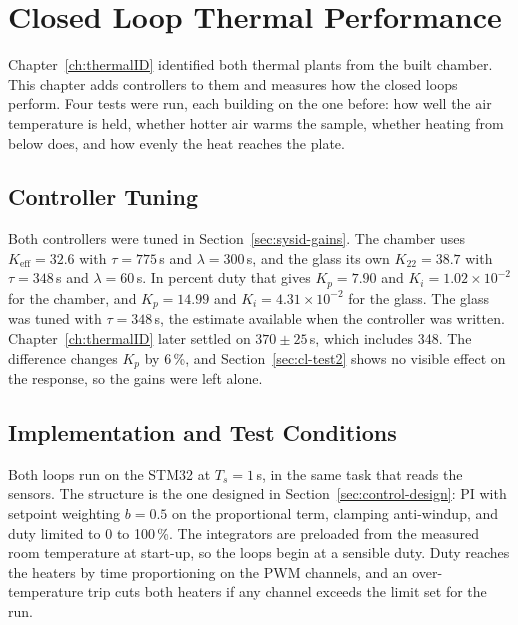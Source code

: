 \chapter{Closed Loop Thermal Performance}
\label{ch:ClosedLoop}


Chapter~\ref{ch:thermalID} identified both thermal plants from the built chamber. This chapter adds controllers to them and measures how the closed loops perform. Four tests were run, each building on the one before: how well the air temperature is held, whether hotter air warms the sample, whether heating from below does, and how evenly the heat reaches the plate.

\section{Controller Tuning}
\label{sec:cl-tuning}

Both controllers were tuned in Section~\ref{sec:sysid-gains}. The chamber uses $K_\mathrm{eff} = 32.6$ with $\tau = 775$\,s and $\lambda = 300$\,s, and the glass its own $K_{22} = 38.7$ with $\tau = 348$\,s and $\lambda = 60$\,s. In percent duty that gives $K_p = 7.90$ and $K_i = 1.02\times10^{-2}$ for the chamber, and $K_p = 14.99$ and $K_i = 4.31\times10^{-2}$ for the glass. The glass was tuned with $\tau = 348$\,s, the estimate available when the controller was written. Chapter~\ref{ch:thermalID} later settled on $370 \pm 25$\,s, which includes 348. The difference changes $K_p$ by 6\,\%, and Section~\ref{sec:cl-test2} shows no visible effect on the response, so the gains were left alone.

\section{Implementation and Test Conditions}
\label{sec:cl-implementation}


Both loops run on the STM32 at $T_s = 1$\,s, in the same task that reads the sensors. The structure is the one designed in Section~\ref{sec:control-design}: PI with setpoint weighting $b = 0.5$ on the proportional term, clamping anti-windup, and duty limited to 0 to 100\,\%. The integrators are preloaded from the measured room temperature at start-up, so the loops begin at a sensible duty. Duty reaches the heaters by time proportioning on the PWM channels, and an over-temperature trip cuts both heaters if any channel exceeds the limit set for the run.

